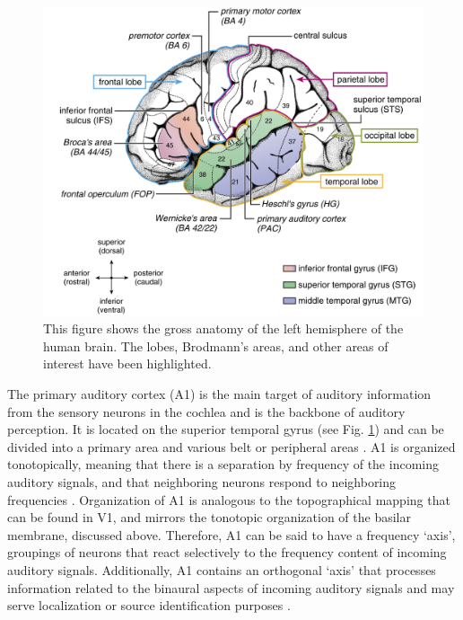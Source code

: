 \documentclass[titlepage]{article}
\begin{document}
    \begin{figure}
      \centering
      \includegraphics[scale=0.25]{primaryAuditoryAnatomy}
      \caption{This figure shows the gross anatomy of the left hemisphere
      of the human brain. The lobes, Brodmann's areas, and other areas
      of interest have been highlighted. \cite{Friederici2011}}
      \label{primaryAuditoryAnatomy}
    \end{figure}

    The primary auditory cortex (A1) is the main target of auditory information
    from the sensory neurons in the cochlea and is the backbone of auditory
    perception. It is located on the superior temporal gyrus
    (see Fig. \ref{primaryAuditoryAnatomy}) and can be divided into a primary
    area and various belt or peripheral areas \cite{Purves2001}. A1 is organized
    tonotopically, meaning that there is a separation by frequency of the
    incoming auditory signals, and that neighboring neurons respond to
    neighboring frequencies \cite{Lauter1985}. Organization of A1 is analogous
    to the topographical mapping that can be found in V1, and mirrors the
    tonotopic organization of the basilar membrane, discussed above.
    Therefore, A1 can be said to
    have a frequency `axis', groupings of neurons that react selectively to the
    frequency content of incoming auditory signals. Additionally, A1 contains an
    orthogonal `axis' that processes information related to the binaural aspects
    of incoming auditory signals and may serve localization or source
    identification purposes \cite{Purves2001}.
\end{document}
